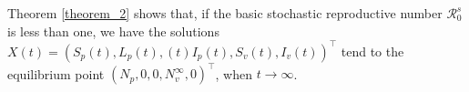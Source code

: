 \begin{remark}
	Theorem \ref{theorem_2} shows that, if the basic stochastic reproductive number $\mathcal{R}^s_0$ is less than one, we have the solutions $X(t)=(S_p (t), L_p (t), (t ) I_p (t), S_v (t), I_v (t))^{\top}$ tend to the equilibrium point $(N_p, 0,0, N_v^{\infty}, 0)^{\top}$, when $t\rightarrow \infty$.
\end{remark}